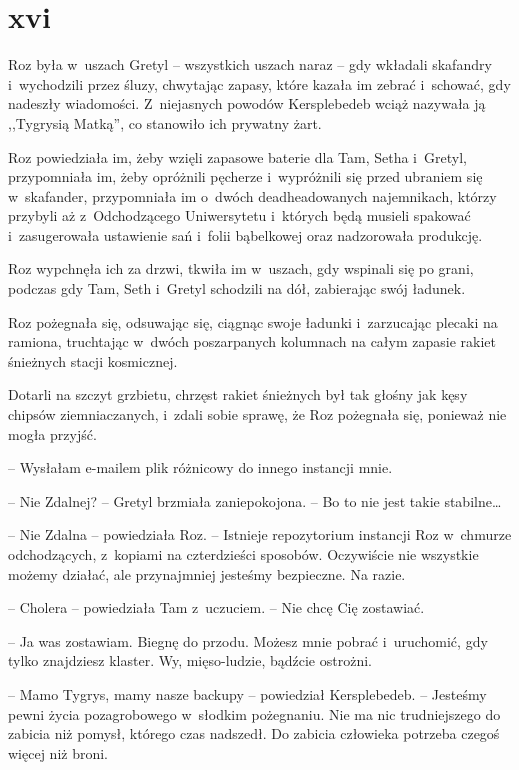 \documentclass[oneside,polish,11pt,sfheadings]{mwbk}
\begin{document}
\chapter*{xvi}

Roz była w~uszach Gretyl -- wszystkich uszach naraz -- gdy wkładali
skafandry i~wychodzili przez śluzy, chwytając zapasy, które kazała im
zebrać i~schować, gdy nadeszły wiadomości. Z~niejasnych powodów
Kersplebedeb wciąż nazywała ją ,,Tygrysią Matką'', co stanowiło ich
prywatny żart.

Roz powiedziała im, żeby wzięli zapasowe baterie dla Tam, Setha i~Gretyl, przypomniała im, żeby opróżnili pęcherze i~wypróżnili się przed
ubraniem się w~skafander, przypomniała im o~dwóch deadheadowanych
najemnikach, którzy przybyli aż z~Odchodzącego Uniwersytetu i~których
będą musieli spakować i~zasugerowała ustawienie sań i~folii bąbelkowej
oraz nadzorowała produkcję.

Roz wypchnęła ich za drzwi, tkwiła im w~uszach, gdy wspinali się po
grani, podczas gdy Tam, Seth i~Gretyl schodzili na dół, zabierając swój
ładunek.

Roz pożegnała się, odsuwając się, ciągnąc swoje ładunki i~zarzucając
plecaki na ramiona, truchtając w~dwóch poszarpanych kolumnach na całym
zapasie rakiet śnieżnych stacji kosmicznej.

Dotarli na szczyt grzbietu, chrzęst rakiet śnieżnych był tak głośny jak
kęsy chipsów ziemniaczanych, i~zdali sobie sprawę, że Roz pożegnała się,
ponieważ nie mogła przyjść.

-- Wysłałam e-mailem plik różnicowy do innego instancji mnie.

-- Nie Zdalnej? -- Gretyl brzmiała zaniepokojona. -- Bo to nie jest takie
stabilne\ldots 

-- Nie Zdalna -- powiedziała Roz. -- Istnieje repozytorium instancji Roz w~chmurze odchodzących, z~kopiami na czterdzieści sposobów. Oczywiście nie
wszystkie możemy działać, ale przynajmniej jesteśmy bezpieczne. Na
razie.

-- Cholera -- powiedziała Tam z~uczuciem. -- Nie chcę Cię zostawiać.

-- Ja was zostawiam. Biegnę do przodu. Możesz mnie pobrać i~uruchomić,
gdy tylko znajdziesz klaster. Wy, mięso-ludzie, bądźcie ostrożni.

-- Mamo Tygrys, mamy nasze backupy -- powiedział Kersplebedeb. -- Jesteśmy
pewni życia pozagrobowego w~słodkim pożegnaniu. Nie ma nic trudniejszego
do zabicia niż pomysł, którego czas nadszedł. Do zabicia człowieka
potrzeba czegoś więcej niż broni.
\end{document}
